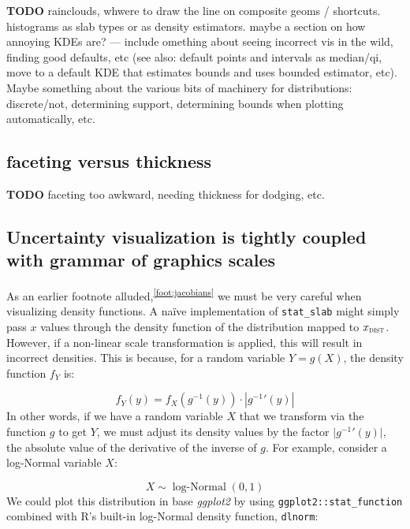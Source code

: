 \documentclass[journal]{vgtc}                     %
\begin{document}
\textbf{TODO} rainclouds, whwere to draw the line on composite geoms / shortcuts. histograms as slab types or as density estimators. maybe a section on how annoying KDEs are? --- include omething about seeing incorrect vis in the wild, finding good defaults, etc (see also: default points and intervals as median/qi, move to a default KDE that estimates bounds and uses bounded estimator, etc). Maybe something about the various bits of machinery for distributions: discrete/not, determining support, determining bounds when plotting automatically, etc.

\subsection{faceting versus thickness}

\textbf{TODO} faceting too awkward, needing thickness for dodging, etc.

\subsection{Uncertainty visualization is tightly coupled with grammar of graphics scales}
\label{sec:jacobians}

As an earlier footnote alluded,\textsuperscript{\ref{foot:jacobians}}   we must be very careful when visualizing density functions. A na\"{i}ve implementation of \texttt{stat\_slab} might simply pass $x$ values through the density function of the distribution mapped to $x_\textsc{dist}$. However, if a non-linear scale transformation is applied, this will result in incorrect densities. This is because, for a random variable $Y = g(X)$, the density function $f_Y$ is:

\[
f_Y(y) = f_X\left(g^{-1}(y)\right) \cdot \left| {g^{-1}}'(y) \right|
\]
In other words, if we have a random variable $X$ that we transform via the function $g$ to get $Y$, we must adjust its density values by the factor $\lvert {g^{-1}}'(y) \rvert$, the absolute value of the derivative of the inverse of $g$. For example, consider a log-Normal variable $X$:

\[
X \sim \operatorname{log-Normal}(0, 1)
\]
We could plot this distribution in base \textit{ggplot2} by using \texttt{ggplot2::stat\_function} combined with R's built-in log-Normal density function, \texttt{dlnorm}:
\end{document}
